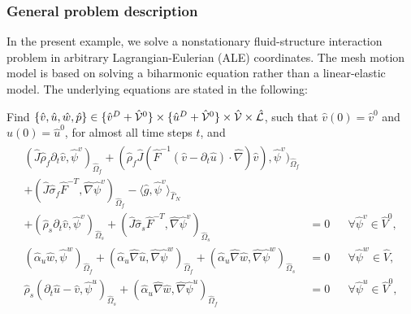 \subsubsection{General problem description}

In the present example, we solve a 
nonstationary fluid-structure interaction problem in 
arbitrary Lagrangian-Eulerian (ALE) coordinates. 
The mesh motion model is based on solving a biharmonic equation
\cite{Wi11} rather than a linear-elastic model. 
The underlying equations are stated in the following:
\begin{Problem}
  \label{eq:fsi:ale:biharmonic}
  Find $\{\hat v,\hat u,\hat w,\hat p\} \in \{ \hat v^D + \hat {\cal V}^0\} 
\times \{ \hat u^D + \hat {\cal V}^0 \}\times \hat {\cal V} \times \hat {\cal
  L}$, such that $\hat v (0) = \hat v^0$ and $\hat u(0) = \hat u^0$, 
for almost all time steps $t$, and
  \begin{eqnarray*}
    \begin{aligned}
      (\hat J \hat\rho_f \partial_t \hat v,\hat\psi^v)_{\hat\Omega_f}  
      +(\hat\rho_f \hat J  (\hat F^{-1}(\hat
      v-\partial_t \hat u)\cdot\hat\nabla) \hat v),
      \hat\psi^v)_{\hat\Omega_f} &\\
      + (\hat J\hat\sigma_f\hat
      F^{-T},\hat\nabla\hat\psi^v)_{\hat\Omega_f}
      - \langle \hat g, \hat\psi^v \rangle_{\hat\Gamma_N}&\\ 
      + (\hat\rho_s \partial_t \hat v,\hat\psi^v)_{\hat\Omega_s}  
      + (\hat J\hat\sigma_s\hat F^{-T},\hat\nabla\hat\psi^v)_{\hat\Omega_s}
      &= 0&&\forall\hat\psi^v\in \hat V^0,
      \\
      (\hat\alpha_u\hat w, \hat\psi^w)_{\hat\Omega_f}  + ( \hat\alpha_u\hat\nabla\hat
      u, \hat\nabla\hat\psi^w)_{\hat\Omega_f} +( \hat\alpha_u\hat\nabla\hat
      w, \hat\nabla\hat\psi^w)_{\hat\Omega_s}  
      & = 0 &&\forall\hat\psi^w\in \hat V , \\
      \hat\rho_s (\partial_t\hat u-\hat v,\hat\psi^u)_{\hat\Omega_s}
      + (\hat\alpha_u \hat \nabla \hat w,\hat \nabla\hat\psi^u)_{\hat\Omega_f}
      &=0&&\forall\hat\psi^u\in \hat V^0 ,\\    

\end{aligned}
\end{eqnarray*}
\end{Problem}
